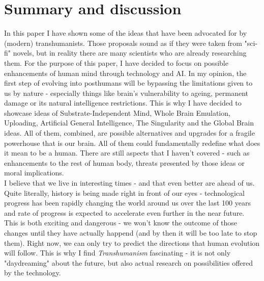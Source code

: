 \documentclass[12pt]{article}
\begin{document}
\section{Summary and discussion} 
	In this paper I have shown some of the ideas that have been advocated for by (modern) transhumanists. Those proposals sound as if they were taken from "sci-fi" novels, but in reality there are many scientists who are already researching them. For the purpose of this paper, I have decided to focus on possible enhancements of human mind through technology and AI. In my opinion, the first step of evolving into posthumans will be bypassing the limitations given to us by nature - especially things like brain's vulnerability to ageing, permanent damage or its natural intelligence restrictions. This is why I have decided to showcase ideas of Substrate-Independent Mind, Whole Brain Emulation, Uploading, Artificial General Intelligence, The Singularity and the Global Brain ideas. All of them, combined, are possible alternatives and upgrades for a fragile powerhouse that is our brain. All of them could fundamentally redefine what does it mean to be a human. There are still aspects that I haven't covered - such as enhancements to the rest of human body, threats presented by those ideas or moral implications. 
	\\I believe that we live in interesting times - and that even better are ahead of us. Quite literally, history is being made right in front of our eyes - technological progress has been rapidly changing the world around us over the last 100 years and rate of progress is expected to accelerate even further in the near future. This is both exciting and dangerous - we won't know the outcome of those changes until they have actually happend (and by then it will be too late to stop them). Right now, we can only try to predict the directions that human evolution will follow. This is why I find \emph{Transhumanism} fascinating - it is not only "daydreaming" about the future, but also actual research on possibilities offered by the technology.

\raggedright


\end{document}
